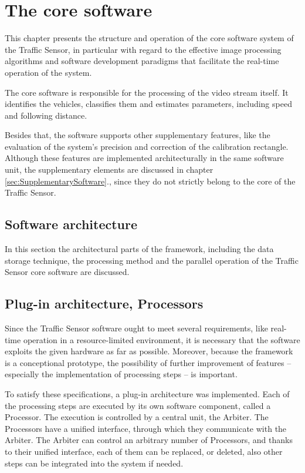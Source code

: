 \chapter{The core software}\label{chap:Core software}
This chapter presents the structure and operation of the core software system of the Traffic Sensor, in particular with regard to the effective image processing algorithms and software development paradigms that facilitate the real-time operation of the system.

The core software is responsible for the processing of the video stream itself.
It identifies the vehicles, classifies them and estimates parameters, including speed and following distance.
 
Besides that, the software supports other supplementary features, like the evaluation of the system's precision and correction of the calibration rectangle.
Although these features are implemented architecturally in the same software unit, the supplementary elements are discussed in chapter \ref{sec:SupplementarySoftware}., since they do not strictly belong to the core of the Traffic Sensor.
\section{Software architecture}
In this section the architectural parts of the framework, including the data storage technique, the processing method and the parallel operation of the Traffic Sensor core software are discussed.

\section{Plug-in architecture, Processors}
Since the Traffic Sensor software ought to meet several requirements, like real-time operation in a resource-limited environment, it is necessary that the software exploits the given hardware as far as possible.
Moreover, because the framework is a conceptional prototype, the possibility of further improvement of features -- especially the implementation of processing steps -- is important.

To satisfy these specifications, a plug-in architecture was implemented.
Each of the processing steps are executed by its own software component, called a Processor.
The execution is controlled by a central unit, the Arbiter.
The Processors have a unified interface, through which they communicate with the Arbiter.
The Arbiter can control an arbitrary number of Processors, and thanks to their unified interface, each of them can be replaced, or deleted, also other steps can be integrated into the system if needed.

